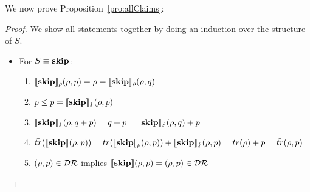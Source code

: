 \documentclass[a4paper,UKenglish,cleveref, autoref, thm-restate]{lipics-v2021}
\begin{document}
We now prove Proposition~\ref{pro:allClaims}:
\begin{proof}
    We show all statements together by doing an induction over the structure of $S$.
\begin{itemize}
        \item For $S \equiv \mathbf{skip}$:
        \begin{enumerate}
            \item $\llbracket \mathbf{skip} \rrbracket_{\rho}(\rho,p) =\rho = \llbracket \mathbf{skip} \rrbracket_{\rho}(\rho,q)$

            \item $p \leq p = \llbracket \mathbf{skip} \rrbracket_{\lightning}(\rho,p)$

            \item $\llbracket \mathbf{skip} \rrbracket_{\lightning}(\rho,q+p) = q+p = \llbracket \mathbf{skip} \rrbracket_{\lightning}(\rho,q) + p$

            \item $\tilde{tr}(\llbracket \mathbf{skip} \rrbracket(\rho,p)) = tr(\llbracket \mathbf{skip} \rrbracket_{\rho}(\rho,p)) + \llbracket \mathbf{skip} \rrbracket_{\lightning}(\rho,p) = tr(\rho) +p = \tilde{tr}(\rho,p)$

            \item $(\rho,p) \in \mathcal{D}\mathcal{R}$ implies $\llbracket \mathbf{skip} \rrbracket(\rho,p) = (\rho,p) \in \mathcal{D}\mathcal{R}$


\end{enumerate}
\end{itemize}
\end{proof}
\end{document}
